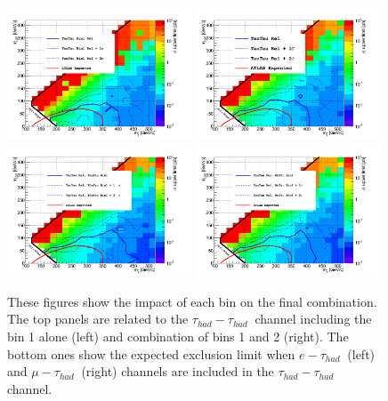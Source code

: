\begin{linenomath}
\begin{figure}[h]
\centering
\includegraphics[width=0.49\textwidth,keepaspectratio=true]{StatisticsFig/NewFigs/TauTau_Bin1Rel.png}
\includegraphics[width=0.49\textwidth,keepaspectratio=true]{StatisticsFig/NewFigs/TauTau_Bin1Rel_Bin2.png}
\includegraphics[width=0.49\textwidth,keepaspectratio=true]{StatisticsFig/NewFigs/TauTau_EleTauBin1.png}
\includegraphics[width=0.49\textwidth,keepaspectratio=true]{StatisticsFig/NewFigs/TauTau_MuTauBin1.png}
\caption{These figures show the impact of each bin on the final combination. 
The top panels are related to the $\tau_{had}-\tau_{had}~$ channel including the bin 1 alone (left) and combination of bins 1 and 2 (right).
The bottom ones show the expected exclusion limit when $e-\tau_{had}~$ (left) and $\mu-\tau_{had}~$ (right) channels are included in the $\tau_{had}-\tau_{had}~$ channel.
}
\label{fig:limit_bins}
\end{figure}
\end{linenomath}

